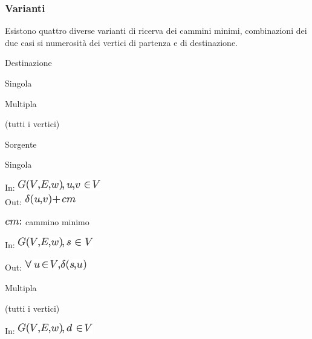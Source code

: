 \documentclass{article}
\begin{document}
{}

{}

{}

\subsubsection{\texorpdfstring{{Varianti}}{Varianti}}\label{h.39wfvuocrt5u}

{Esistono quattro diverse varianti di ricerva dei cammini minimi,
combinazioni dei due casi si numerosità dei vertici di partenza e di
destinazione.}

{}

\protect\hypertarget{t.249d86aca9d964d15cac3725f6a7ace85a3425b4}{}{}\protect\hypertarget{t.45}{}{}

{}

{}

{Destinazione}

{}

{}

{Singola}

{Multipla}

{(tutti i vertici)}

{Sorgente}

{Singola}

{In: }\includegraphics{images/image498.png}{\\
Out: }\includegraphics{images/image499.png}

\includegraphics{images/image500.png}{~cammino minimo}

{In: }\includegraphics{images/image501.png}

{Out: }\includegraphics{images/image502.png}

{Multipla}

{(tutti i vertici)}

{In: }\includegraphics{images/image503.png}
\end{document}
